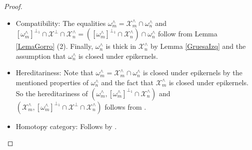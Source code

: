 \documentclass[10pt,reqno]{amsart}
\numberwithin{equation}{section}
\theoremstyle{remark}
\newcommand{\X}{\mathcal{X}}
\begin{document}
\begin{proof}
\begin{itemize}
\begin{itemize}
\item $[\omega^\wedge_m]^{\perp_1} \cap \mathcal{X}^\perp \cap \mathcal{X}^\wedge_n = [\mathcal{X}^\wedge_m]^{\perp_1} \cap \mathcal{X}^\wedge_n$: Since $(\X^\wedge_m, [\omega^{\wedge}_m]^{\perp_1} \cap \X^\perp)$ is a cotorsion pair cut along $\mathcal{X}^\wedge$, we get $[\X^\wedge_m]^{\perp_1} \cap \X^\wedge = [\omega^{\wedge}_m]^{\perp_1} \cap \X^\perp \cap \X^\wedge$. Then, intersection each side of the previous equality with $\X^\wedge_n$ yields the result. 

\item $(\X^\wedge_m, [\omega^{\wedge}_m]^{\perp_1} \cap \X^\perp \cap \mathcal{X}^\wedge_n)$ is complete (in $\mathcal{X}^\wedge_n$): Follows from the facts that $(\X^\wedge_m, [\omega^{\wedge}_m]^{\perp_1} \cap \X^\perp)$ is a cotorsion pair cut along $\mathcal{X}^\wedge$ and that $\mathcal{X}^\wedge_n$ is left thick. 
\end{itemize}

\item Compatibility: The equalities $\omega^\wedge_m = \X^\wedge_m \cap \omega^\wedge_n$ and $[\omega^{\wedge}_m]^{\perp_1} \cap \X^\perp \cap \mathcal{X}^\wedge_n = ([\omega^\wedge_m]^{\perp_1} \cap \mathcal{X}^\wedge_n) \cap \omega^\wedge_n$ follow from Lemma \ref{LemaGorro} (2). Finally, $\omega^\wedge_n$ is thick in $\mathcal{X}^\wedge_n$ by Lemma \ref{GruesaIzq} and the assumption that $\omega^\wedge_n$ is closed under epikernels.

\item Hereditariness: Note that $\omega^\wedge_m = \X^\wedge_m \cap \omega^\wedge_n$ is closed under epikernels by the mentioned properties of $\omega^\wedge_n$ and the fact that $\X^\wedge_m$ is closed under epikernels. So the hereditariness of $(\omega^\wedge_m, [\omega^\wedge_m]^{\perp_1} \cap \mathcal{X}^\wedge_n)$ and $(\X^\wedge_m, [\omega^{\wedge}_m]^{\perp_1} \cap \X^\perp \cap \mathcal{X}^\wedge_n)$ follows from \cite[Lem. 6.17]{Stovi14}.

\item Homotopy category: Follows by \cite[Prop. 5.2, Corolls. 4.8 \& 5.4]{GillespieExact}.
\end{itemize}
\end{proof}
\end{document}
